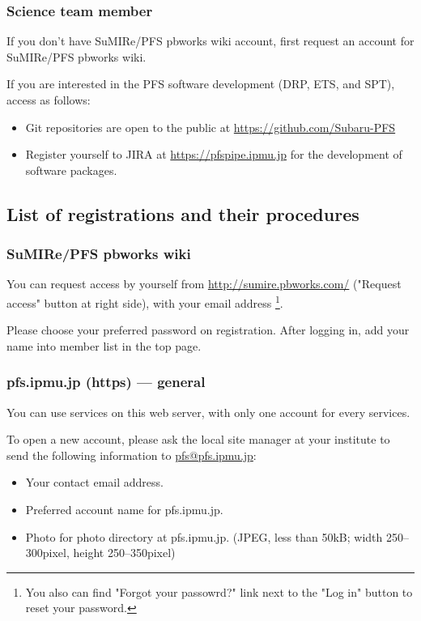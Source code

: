 \documentclass[a4paper,notitlepage]{article}
\begin{document}
\subsubsection{Science team member}

If you don't have SuMIRe/PFS pbworks wiki account, first request an account 
for SuMIRe/PFS pbworks wiki. 

If you are interested in the PFS software development (DRP, ETS, and SPT), 
access as follows: 
\begin{itemize}
  \item Git repositories are open to the public at \url{https://github.com/Subaru-PFS}
  \item Register yourself to JIRA at \url{https://pfspipe.ipmu.jp} for the development of software packages.
\end{itemize}

\subsection{List of registrations and their procedures}
\label{sec:listofregist}

\subsubsection{SuMIRe/PFS pbworks wiki}

You can request access by yourself from \url{http://sumire.pbworks.com/} 
("Request access" button at right side), with your email address
\footnote{You also can find "Forgot your passowrd?" link next to the "Log in" 
button to reset your password.}.

Please choose your preferred password on registration. 
After logging in, add your name into member list in the top page. 

\subsubsection{pfs.ipmu.jp (https) --- general}

You can use services on this web server, with only one account for every 
services.

To open a new account, please ask the local site manager at your institute 
to send the following information to \url{pfs@pfs.ipmu.jp}: 
\begin{itemize}
  \item Your contact email address.
  \item Preferred account name for pfs.ipmu.jp.
  \item Photo for photo directory at pfs.ipmu.jp. (JPEG, less than 50kB; width 
    250--300pixel, height 250--350pixel)
\end{itemize}
\end{document}
